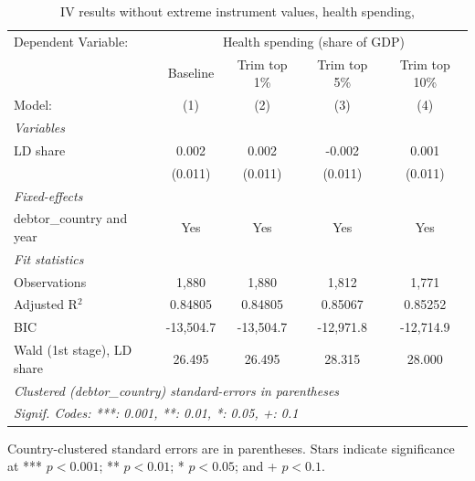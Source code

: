 
\begin{table}[htbp]
   \caption{\label{tab:results_iv_trim_top_health_} IV results without extreme instrument values, health spending, }
   \centering
   \begin{tabular}{lcccc}
      \tabularnewline \midrule \midrule
      Dependent Variable: & \multicolumn{4}{c}{Health spending (share of GDP)}\\
                                 & Baseline  & Trim top 1\%  & Trim top 5\%  & Trim top 10\% \\    
      Model:                     & (1)       & (2)           & (3)           & (4)\\  
      \midrule
      \emph{Variables}\\
      LD share                   & 0.002     & 0.002         & -0.002        & 0.001\\   
                                 & (0.011)   & (0.011)       & (0.011)       & (0.011)\\   
      \midrule
      \emph{Fixed-effects}\\
      debtor\_country and year   & Yes       & Yes           & Yes           & Yes\\  
      \midrule
      \emph{Fit statistics}\\
      Observations               & 1,880     & 1,880         & 1,812         & 1,771\\  
      Adjusted R$^2$             & 0.84805   & 0.84805       & 0.85067       & 0.85252\\  
      BIC                        & -13,504.7 & -13,504.7     & -12,971.8     & -12,714.9\\  
      Wald (1st stage), LD share & 26.495    & 26.495        & 28.315        & 28.000\\  
      \midrule \midrule
      \multicolumn{5}{l}{\emph{Clustered (debtor\_country) standard-errors in parentheses}}\\
      \multicolumn{5}{l}{\emph{Signif. Codes: ***: 0.001, **: 0.01, *: 0.05, +: 0.1}}\\
   \end{tabular}
   
   \par \raggedright 
   Country-clustered standard errors are in parentheses. Stars indicate significance at *** $p < 0.001$; ** $p < 0.01$; * $p < 0.05$; and + $p < 0.1$.
\end{table}


